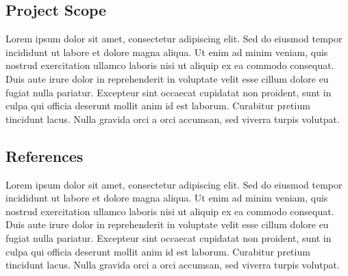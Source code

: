 \subsection{Project Scope}
Lorem ipsum dolor sit amet, consectetur adipiscing elit. Sed do eiusmod tempor incididunt ut labore et dolore magna aliqua. Ut enim ad minim veniam, quis nostrud exercitation ullamco laboris nisi ut aliquip ex ea commodo consequat. Duis aute irure dolor in reprehenderit in voluptate velit esse cillum dolore eu fugiat nulla pariatur. Excepteur sint occaecat cupidatat non proident, sunt in culpa qui officia deserunt mollit anim id est laborum. Curabitur pretium tincidunt lacus. Nulla gravida orci a orci accumsan, sed viverra turpis volutpat.

\subsection{References}
Lorem ipsum dolor sit amet, consectetur adipiscing elit. Sed do eiusmod tempor incididunt ut labore et dolore magna aliqua. Ut enim ad minim veniam, quis nostrud exercitation ullamco laboris nisi ut aliquip ex ea commodo consequat. Duis aute irure dolor in reprehenderit in voluptate velit esse cillum dolore eu fugiat nulla pariatur. Excepteur sint occaecat cupidatat non proident, sunt in culpa qui officia deserunt mollit anim id est laborum. Curabitur pretium tincidunt lacus. Nulla gravida orci a orci accumsan, sed viverra turpis volutpat.


